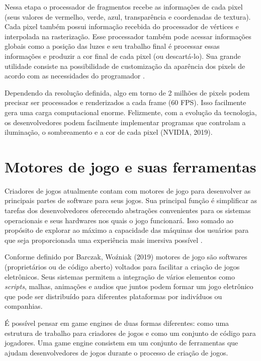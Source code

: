 Nessa etapa o processador de fragmentos recebe as informações de cada pixel (seus valores de vermelho, verde, azul, transparência e coordenadas de textura). Cada pixel também possui informação recebida do processador de vértices e interpolada na rasterização. Esse processador também pode acessar informações globais como a posição das luzes e seu trabalho final é processar essas informações e produzir a cor final de cada pixel (ou descartá-lo). Sua grande utilidade consiste na possibilidade de customização da aparência dos pixels de acordo com as necessidades do programador \cite{bailey2007}. 

Dependendo da resolução definida, algo em torno de 2 milhões de pixels podem precisar ser processados e renderizados a cada frame (60 FPS). Isso facilmente gera uma carga computacional enorme. Felizmente, com a evolução da tecnologia, os desenvolvedores podem facilmente implementar programas que controlam a iluminação, o sombreamento e a cor de cada pixel (NVIDIA, 2019)\nocite{fragShader}.

\section{Motores de jogo e suas ferramentas}
\label{sec:motores-jogo-ferramentas}

Criadores de jogos atualmente contam com motores de jogo para desenvolver as principais partes de software para seus jogos. Sua principal função é simplificar as tarefas dos desenvolvedores oferecendo abstrações convenientes para os sistemas operacionais e seus hardwares nos quais o jogo funcionará. Isso somado ao propósito de explorar ao máximo a capacidade das máquinas dos usuários para que seja proporcionada uma experiência mais imersiva possível \cite{simon2015unity}.

Conforme definido por Barczak, Woźniak (2019) motores de jogo são softwares (proprietários ou de código aberto) voltados para facilitar a criação de jogos eletrônicos. Seus sistemas permitem a integração de vários elementos como \textit{\Gls{scripts}}, malhas, animações e audios que juntos podem formar um jogo eletrônico que pode ser distribuído para diferentes plataformas por indivíduos ou companhias. 

É possível pensar em game engines de duas formas diferentes: como uma estrutura de trabalho para criadores de jogos e como um conjunto de código para jogadores. Uma game engine consistem em um conjunto de ferramentas que ajudam desenvolvedores de jogos durante o processo de criação de jogos.

